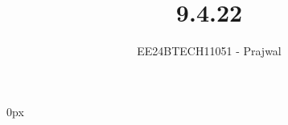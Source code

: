 \documentclass[journal]{IEEEtran}
\begin{document}

\vspace{3cm}
\parindent 0px

\title{9.4.22}
\author{EE24BTECH11051 - Prajwal}
{\let\newpage\relax\maketitle}

\renewcommand{\thefigure}{\theenumi}
\renewcommand{\thetable}{\theenumi}
\setlength{\intextsep}{10pt} %


\renewcommand{\thetable}{\theenumi}
\end{document}
